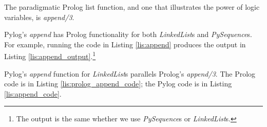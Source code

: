 The paradigmatic Prolog list function, and one that illustrates the power of logic variables, is \textit{append/3}. 

Pylog's \textit{append} has Prolog functionality for both \textit{LinkedList}s and \textit{PySequence}s. For example, running the code in Listing \ref{lis:append} produces the output in Listing \ref{lis:append_output}.\footnote{The output is the same whether we use \textit{PySequence}s or \textit{LinkedList}s.}







\smallv

Pylog's \textit{append} function for \textit{LinkedList}s parallels Prolog's \textit{append/3}. The Prolog code is in Listing \ref{lis:prolog_append_code}; the Pylog code is in  Listing \ref{lis:append_code}.


